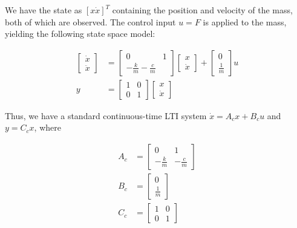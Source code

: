 \documentclass{article}
\begin{document}
We have the state as $[x \dot{x}]^T$ containing the position and velocity of the mass, both of which are observed.
The control input $u=F$ is applied to the mass, yielding the following state space model:

$$
\begin{aligned}
  \begin{bmatrix}
    \dot{x} \\
    \ddot{x}
  \end{bmatrix} &=
  \begin{bmatrix}
    0 & 1 \\
    -\frac{k}{m}  -\frac{c}{m}
  \end{bmatrix}
  \begin{bmatrix}
    x \\
    \dot{x}
  \end{bmatrix} +
  \begin{bmatrix}
    0 \\
    \frac{1}{m}
  \end{bmatrix} u \\
  y &=
  \begin{bmatrix}
    1 & 0 \\
    0 & 1
  \end{bmatrix}
  \begin{bmatrix}
    x \\
    \dot{x}
  \end{bmatrix}
\end{aligned}
$$

Thus, we have a standard continuous-time LTI system $\dot{x} = A_cx + B_cu$ and $y = C_cx$, where

\begin{equation}
  \begin{aligned}
    A_c &=
    \begin{bmatrix}
      0 & 1 \\
      -\frac{k}{m} & -\frac{c}{m}
    \end{bmatrix} \\
    B_c &=
    \begin{bmatrix}
      0 \\
      \frac{1}{m}
    \end{bmatrix} \\
    C_c &=
    \begin{bmatrix}
      1 & 0 \\
      0 & 1
    \end{bmatrix}
  \end{aligned}
\end{equation}
\end{document}

